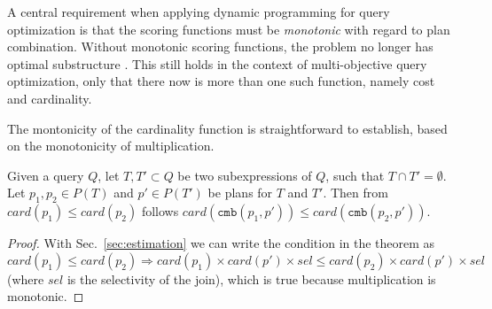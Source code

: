 
A central requirement when applying dynamic programming for query
optimization is that the scoring functions must be \emph{monotonic}
with regard to plan combination. Without monotonic scoring functions,
the problem no longer has optimal substructure . This still holds in the context of
multi-objective query optimization, only that there now is more than
one such function, namely cost and cardinality.

The montonicity of the cardinality function is straightforward to
establish, based on the monotonicity of multiplication.

\begin{theorem}
  Given a query $Q$, let $T,T' \subset Q$ be two subexpressions of
  $Q$, such that $T \cap T' = \emptyset$. Let $p_1,p_2 \in P(T)$ and
  $p' \in P(T')$ be plans for $T$ and $T'$. Then from $card(p_1) \leq
  card(p_2)$ follows $card(\mathtt{cmb}(p_1,p')) \leq
  card(\mathtt{cmb}(p_2,p'))$.
\end{theorem}
\begin{proof}
  With Sec.~\ref{sec:estimation} we can write the condition in
  the theorem as $card(p_1) \leq card(p_2) \Rightarrow card(p_1)
  \times card(p') \times sel \leq card(p_2) \times card(p') \times
  sel$ (where $sel$ is the selectivity of the join), which is true
  because multiplication is monotonic.
\end{proof}

